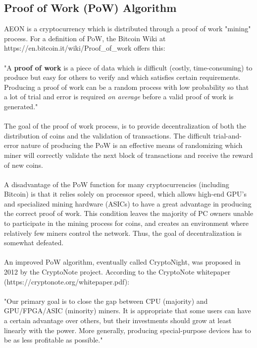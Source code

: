 \subsection{Proof of Work (PoW) Algorithm}
AEON is a cryptocurrency which is distributed through a proof of work "mining" process.  For a definition of PoW, the Bitcoin Wiki at https://en.bitcoin.it/wiki/Proof\_of\_work offers this:\\
\\
"A \textbf{proof of work} is a piece of data which is difficult (costly, time-consuming) to produce but easy for others to verify and which satisfies certain requirements. Producing a proof of work can be a random process with low probability so that a lot of trial and error is required \textit{on average} before a valid proof of work is generated."\\
\\
The goal of the proof of work process, is to provide decentralization of both the distribution of coins and the validation of transactions. The difficult trial-and-error nature of producing the PoW is an effective means of randomizing which miner will correctly validate the next block of transactions and receive the reward of new coins.\\
\\
A disadvantage of the PoW function for many cryptocurrencies (including Bitcoin) is that it relies solely on processor speed, which allows high-end GPU's and specialized mining hardware (ASICs) to have a great advantage in producing the correct proof of work. This condition leaves the majority of PC owners unable to participate in the mining process for coins, and creates an environment where relatively few miners control the network.  Thus, the goal of decentralization is somewhat defeated.\\
\\
An improved PoW algorithm, eventually called CryptoNight, was proposed in 2012 by the CryptoNote project. According to the CryptoNote whitepaper (https://cryptonote.org/whitepaper.pdf):\\
\\
"Our primary goal is to close the gap between CPU (majority) and GPU/FPGA/ASIC (minority) miners. It is appropriate that some users can have a certain advantage over others, but their investments should grow at least linearly with the power. More generally, producing special-purpose devices has to be as less profitable as possible."\\
\\
